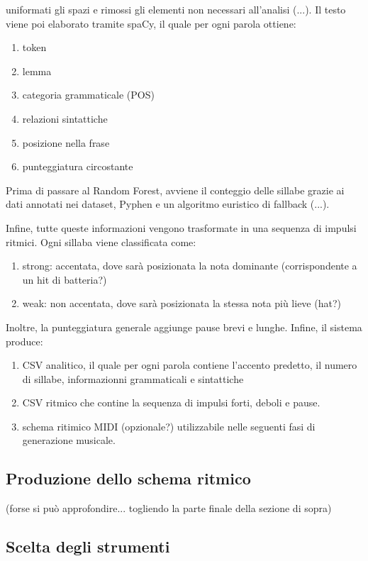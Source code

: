 uniformati gli spazi e rimossi gli elementi non necessari all'analisi (...).
Il testo viene poi elaborato tramite spaCy, il quale per ogni parola ottiene:
\begin{enumerate}
    \item token
    \item lemma
    \item categoria grammaticale (POS)
    \item relazioni sintattiche
    \item posizione nella frase
    \item punteggiatura circostante
\end{enumerate}
Prima di passare al Random Forest, avviene il conteggio delle sillabe grazie ai dati annotati nei dataset, Pyphen e un algoritmo euristico di fallback (...).\newline

Infine, tutte queste informazioni vengono trasformate in una sequenza di impulsi ritmici. Ogni sillaba viene classificata come:
\begin{enumerate}
    \item strong: accentata, dove sarà posizionata la nota dominante (corrispondente a un hit di batteria?)
    \item weak: non accentata, dove sarà posizionata la stessa nota più lieve (hat?)
\end{enumerate}
Inoltre, la punteggiatura generale aggiunge pause brevi e lunghe.\newline
Infine, il sistema produce:
\begin{enumerate}
    \item CSV analitico, il quale per ogni parola contiene l'accento predetto, il numero di sillabe, informazionni grammaticali e sintattiche
    \item CSV ritmico che contine la sequenza di impulsi forti, deboli e pause.
    \item schema ritimico MIDI (opzionale?) utilizzabile nelle seguenti fasi di generazione musicale. 
\end{enumerate}



\subsection{Produzione dello schema ritmico}
(forse si può approfondire... togliendo la parte finale della sezione di sopra)
\subsection{Scelta degli strumenti}
